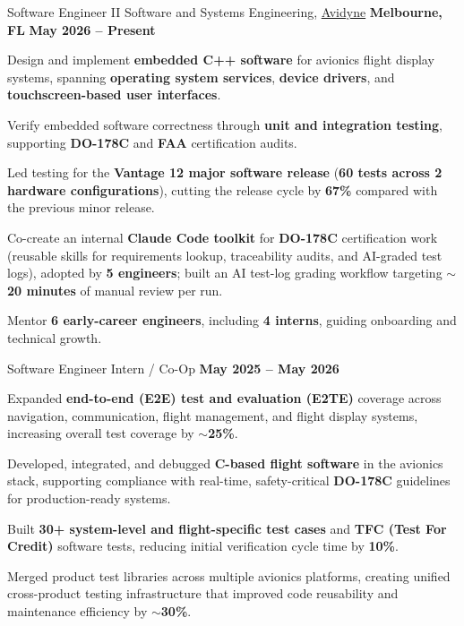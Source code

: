 \begin{cventries}

\cventry
{Software Engineer II}
{Software and Systems Engineering, \href{https://www.avidyne.com/}{Avidyne}}
{\textbf{Melbourne, FL}}
{\textbf{May 2026 – Present}}
{
\begin{cvitems}
  \item Design and implement \textbf{embedded C++ software} for avionics flight display systems, spanning \textbf{operating system services}, \textbf{device drivers}, and \textbf{touchscreen-based user interfaces}.
  \item Verify embedded software correctness through \textbf{unit and integration testing}, supporting \textbf{DO-178C} and \textbf{FAA} certification audits.
  \item Led testing for the \textbf{Vantage 12 major software release} (\textbf{60 tests across 2 hardware configurations}), cutting the release cycle by \textbf{67\%} compared with the previous minor release.
  \item Co-create an internal \textbf{Claude Code toolkit} for \textbf{DO-178C} certification work (reusable skills for requirements lookup, traceability audits, and AI-graded test logs), adopted by \textbf{5 engineers}; built an AI test-log grading workflow targeting $\sim$\textbf{20 minutes} of manual review per run.
  \item Mentor \textbf{6 early-career engineers}, including \textbf{4 interns}, guiding onboarding and technical growth.
\end{cvitems}
}
\cventry
{Software Engineer Intern / Co-Op}
{}
{}
{\textbf{May 2025 – May 2026}}
{
\begin{cvitems}
  \item Expanded \textbf{end-to-end (E2E) test and evaluation (E2TE)} coverage across navigation, communication, flight management, and flight display systems, increasing overall test coverage by $\sim$\textbf{25\%}.
  \item Developed, integrated, and debugged \textbf{C-based flight software} in the avionics stack, supporting compliance with real-time, safety-critical \textbf{DO-178C} guidelines for production-ready systems.
  \item Built \textbf{30+ system-level and flight-specific test cases} and \textbf{TFC (Test For Credit)} software tests, reducing initial verification cycle time by \textbf{10\%}.
  \item Merged product test libraries across multiple avionics platforms, creating unified cross-product testing infrastructure that improved code reusability and maintenance efficiency by $\sim$\textbf{30\%}.

\end{cvitems}}
\end{cventries}
